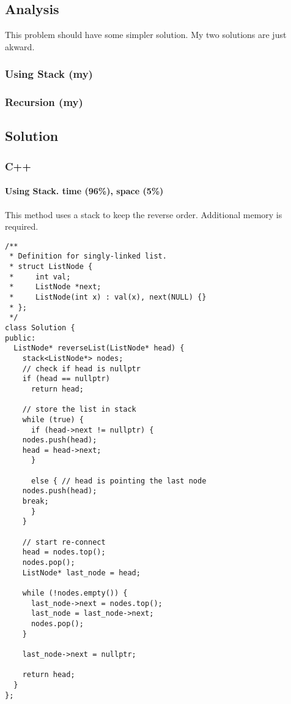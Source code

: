 \documentclass[11pt]{article}
\begin{document}
\subsection{Analysis}
\label{sec:orgb4ceaa4}
This problem should have some simpler solution. My two solutions are just akward.
\subsubsection{Using Stack (my)}
\label{sec:org5c4ac8a}
\subsubsection{Recursion (my)}
\label{sec:org7d2780b}
\subsection{Solution}
\label{sec:orgaebe556}
\subsubsection{C++}
\label{sec:org7776b7e}
\paragraph{Using Stack. time (96\%), space (5\%)}
\label{sec:org5aa6809}
This method uses a stack to keep the reverse order. Additional memory is required.
\begin{verbatim}
/**
 * Definition for singly-linked list.
 * struct ListNode {
 *     int val;
 *     ListNode *next;
 *     ListNode(int x) : val(x), next(NULL) {}
 * };
 */
class Solution {
public:
  ListNode* reverseList(ListNode* head) {
    stack<ListNode*> nodes;
    // check if head is nullptr
    if (head == nullptr)
      return head;

    // store the list in stack 
    while (true) {
      if (head->next != nullptr) {
	nodes.push(head);
	head = head->next;
      }

      else { // head is pointing the last node
	nodes.push(head);
	break;
      }
    }

    // start re-connect
    head = nodes.top();
    nodes.pop();
    ListNode* last_node = head;

    while (!nodes.empty()) {
      last_node->next = nodes.top();
      last_node = last_node->next;
      nodes.pop();
    }

    last_node->next = nullptr;

    return head;
  }
};
\end{verbatim}
\end{document}
